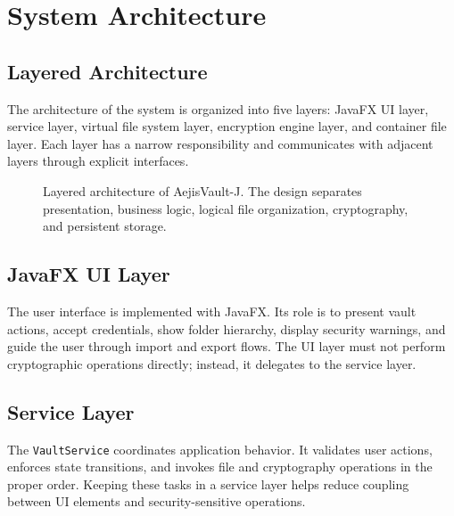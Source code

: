 \documentclass[12pt,a4paper]{report}
\newcommand{\projname}{AejisVault-J}
\begin{document}
\chapter{System Architecture}
\section{Layered Architecture}
The architecture of the system is organized into five layers: JavaFX UI layer, service layer, virtual file system layer, encryption engine layer, and container file layer. Each layer has a narrow responsibility and communicates with adjacent layers through explicit interfaces.

\begin{figure}[H]
\centering
{}
\caption{Layered architecture of \projname{}. The design separates presentation, business logic, logical file organization, cryptography, and persistent storage.}
\label{fig:architecture}
\end{figure}

\section{JavaFX UI Layer}
The user interface is implemented with JavaFX. Its role is to present vault actions, accept credentials, show folder hierarchy, display security warnings, and guide the user through import and export flows. The UI layer must not perform cryptographic operations directly; instead, it delegates to the service layer.

\section{Service Layer}
The \texttt{VaultService} coordinates application behavior. It validates user actions, enforces state transitions, and invokes file and cryptography operations in the proper order. Keeping these tasks in a service layer helps reduce coupling between UI elements and security-sensitive operations.
\end{document}
